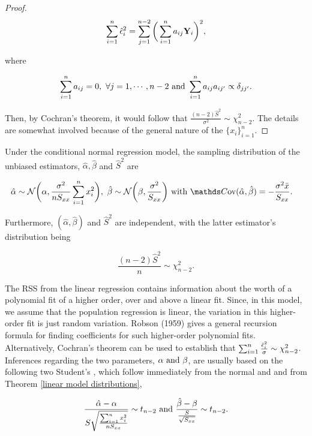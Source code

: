 \documentclass{homework}
\begin{document}
\begin{theo}
{\begin{proof}
$$
\sum_{i=1}^{n} \hat{\epsilon}_i^2 = \sum_{j=1}^{n-2}\bigg(\sum_{i=1}^{n} a_{ij} {\bf Y}_i \bigg)^2,
$$

where 

$$
\sum_{i=1}^{n} a_{ij} = 0, \textnormal{ } \forall j = 1, \cdots, n-2 \textnormal{ and } \sum_{i=1}^{n} a_{ij} a_{ij'} \propto \delta_{jj'}.
$$

Then, by Cochran's theorem, it would follow that $\frac{(n-2)\hat{S}^2}{\sigma^2} \sim \chi^2_{n-2}$. The details are somewhat involved because of the general nature of the $\{x_i\}_{i=1}^{n}$. 

\end{proof}}
Under the conditional normal regression model, the sampling distribution of the unbiased estimators, $\hat{\alpha}, \hat{\beta}$ and $\hat{S}^2$ are 

\begin{align*}
    \hat{\alpha} \sim \N\bigg(\alpha, \frac{\sigma^2}{nS_{xx}} \summation x_i^2\bigg), \blank  & \hat{\beta} \sim \N\bigg(\beta, \frac{\sigma^2}{S_{xx}}\bigg) \textnormal{ with } \cov(\hat{\alpha}, \hat{\beta}) = -\frac{\sigma^2 \bar{x}}{S_{xx}}.
\end{align*}

Furthermore, $(\hat{\alpha}, \hat{\beta})$ and $\hat{S}^2$ are independent, with the latter estimator's distribution being 

$$
\frac{(n-2)\hat{S}^2}{n} \sim \chi_{n-2}^2. 
$$
\end{theo}

\blank \textnormal{}

The RSS from the linear regression contains information about the worth of a polynomial fit of a higher order, over and above a linear fit. Since, in this model, we assume that the population regression is linear, the variation in this higher-order fit is just random variation. Robson (1959) gives a general recursion formula for finding coefficients for such higher-order polynomial fits. Alternatively, Cochran's theorem can be used to establish that $\sum_{i=1}^{n} \frac{\hat{\epsilon}_i^2}{\sigma} \sim \chi^2_{n-2} $. \\

Inferences regarding the two parameters, $\alpha \textnormal{ and } \beta$, are usually based on the following two Student's \tdis, which follow immediately from the normal and \chidis and from Theorem \ref{linear model distributions}, 

\begin{align}
    \frac{\hat{\alpha}-\alpha}{S \sqrt{\frac{\sum_{i=1}^{n} x_i^2}{nS_{xx}}}} \sim t_{n-2} \textnormal{ and } \frac{\hat{\beta}-\beta}{\frac{S}{\sqrt{S_{xx}}}} \sim t_{n-2}.
    \label{parameter distributions}
\end{align}
\end{document}

